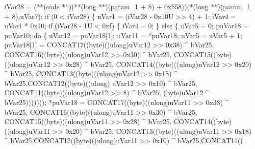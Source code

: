 \documentclass[
]{article}
\newenvironment{Shaded}{}{}
\newcommand{\NormalTok}[1]{#1}
\begin{document}
\begin{Shaded}
\begin{Highlighting}[]
\NormalTok{  iVar28 = (**(code **)(**(long **)(param\_1 + 8) + 0x558))(*(long **)(param\_1 + 8),uVar7);}
\NormalTok{  if (0 \textless{} iVar28) \{}
\NormalTok{    uVar1 = (iVar28 {-} 0x10U \textgreater{}\textgreater{} 4) + 1;}
\NormalTok{    iVar4 = uVar1 * 0x10;}
\NormalTok{    if (iVar28 {-} 1U \textless{} 0xf) \{}
\NormalTok{      iVar4 = 0;}
\NormalTok{    \}}
\NormalTok{    else \{}
\NormalTok{      uVar5 = 0;}
\NormalTok{      puVar18 = puVar10;}
\NormalTok{      do \{}
\NormalTok{        uVar12 = puVar18[1];}
\NormalTok{        uVar11 = *puVar18;}
\NormalTok{        uVar5 = uVar5 + 1;}
\NormalTok{        puVar18[1] = CONCAT17((byte)((ulong)uVar12 \textgreater{}\textgreater{} 0x38) \^{} bVar25,}
\NormalTok{                              CONCAT16((byte)((ulong)uVar12 \textgreater{}\textgreater{} 0x30) \^{} bVar25,}
\NormalTok{                                       CONCAT15((byte)((ulong)uVar12 \textgreater{}\textgreater{} 0x28) \^{} bVar25,}
\NormalTok{                                                CONCAT14((byte)((ulong)uVar12 \textgreater{}\textgreater{} 0x20) \^{} bVar25,}
\NormalTok{                                                         CONCAT13((byte)((ulong)uVar12 \textgreater{}\textgreater{} 0x18) \^{}}
\NormalTok{                                                                  bVar25,CONCAT12((byte)((ulong)}
\NormalTok{                                                  uVar12 \textgreater{}\textgreater{} 0x10) \^{} bVar25,}
\NormalTok{                                                  CONCAT11((byte)((ulong)uVar12 \textgreater{}\textgreater{} 8) \^{} bVar25,}
\NormalTok{                                                           (byte)uVar12 \^{} bVar25)))))));}
\NormalTok{        *puVar18 = CONCAT17((byte)((ulong)uVar11 \textgreater{}\textgreater{} 0x38) \^{} bVar25,}
\NormalTok{                            CONCAT16((byte)((ulong)uVar11 \textgreater{}\textgreater{} 0x30) \^{} bVar25,}
\NormalTok{                                     CONCAT15((byte)((ulong)uVar11 \textgreater{}\textgreater{} 0x28) \^{} bVar25,}
\NormalTok{                                              CONCAT14((byte)((ulong)uVar11 \textgreater{}\textgreater{} 0x20) \^{} bVar25,}
\NormalTok{                                                       CONCAT13((byte)((ulong)uVar11 \textgreater{}\textgreater{} 0x18) \^{}}
\NormalTok{                                                                bVar25,CONCAT12((byte)((ulong)uVar11}
\NormalTok{                                                                                      \textgreater{}\textgreater{} 0x10) \^{}}
\NormalTok{                                                                                bVar25,CONCAT11((}

\end{Highlighting}
\end{Shaded}
\end{document}
